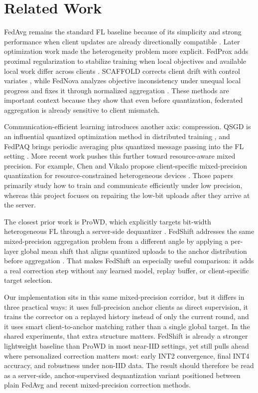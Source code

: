 \section{Related Work}

FedAvg remains the standard FL baseline because of its simplicity and strong
performance when client updates are already directionally compatible
\citep{mcmahan2017}. Later optimization work made the heterogeneity problem more
explicit. FedProx adds proximal regularization to stabilize training when local
objectives and available local work differ across clients \citep{li2020fedprox}.
SCAFFOLD corrects client drift with control variates
\citep{karimireddy2020scaffold}, while FedNova analyzes objective inconsistency
under unequal local progress and fixes it through normalized aggregation
\citep{wang2020fednova}. These methods are important context because they show
that even before quantization, federated aggregation is already sensitive to
client mismatch.

Communication-efficient learning introduces another axis: compression. QSGD is
an influential quantized optimization method in distributed training
\citep{alistarh2017qsgd}, and FedPAQ brings periodic averaging plus quantized
message passing into the FL setting \citep{reisizadeh2020fedpaq}. More recent
work pushes this further toward resource-aware mixed precision. For example,
Chen and Vikalo propose client-specific mixed-precision quantization for
resource-constrained heterogeneous devices \citep{chen2024fedmpq}. Those papers
primarily study how to train and communicate efficiently under low precision,
whereas this project focuses on repairing the low-bit uploads after they arrive
at the server.

The closest prior work is ProWD, which explicitly targets bit-width
heterogeneous FL through a server-side dequantizer
\citep{yoon2022prowd}. FedShift addresses the same mixed-precision aggregation
problem from a different angle by applying a per-layer global mean shift that
aligns quantized uploads to the anchor distribution before aggregation
\citep{seo2024fedshift}. That makes FedShift an especially useful comparison:
it adds a real correction step without any learned model, replay buffer, or
client-specific target selection.

Our implementation sits in this same mixed-precision corridor, but it differs
in three practical ways: it uses full-precision anchor clients as direct
supervision, it trains the corrector on a replayed history instead of only the
current round, and it uses smart client-to-anchor matching rather than a
single global target. In the shared experiments, that extra structure matters.
FedShift is already a stronger lightweight baseline than ProWD in most near-IID
settings, yet \method still pulls ahead where personalized correction matters
most: early INT2 convergence, final INT4 accuracy, and robustness under
non-IID data. The result should therefore be read as a server-side,
anchor-supervised dequantization variant positioned between plain FedAvg and
recent mixed-precision correction methods.
